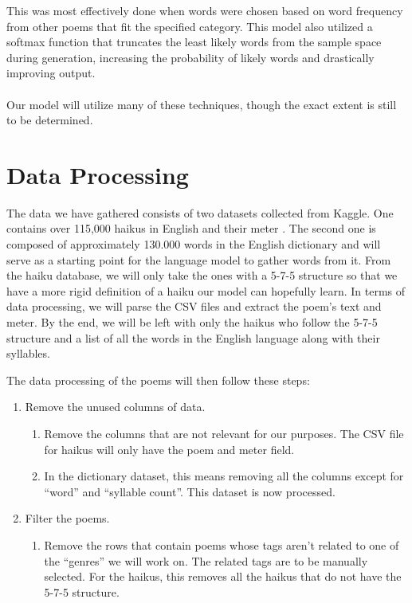 \documentclass{article} %
\begin{document}
This was most effectively done when words were chosen based on word frequency from other poems that fit the specified category. 
This model also utilized a softmax function that truncates the least likely words from the sample space during generation, increasing the probability of likely words and drastically improving output.\\\\
Our model will utilize many of these techniques, though the exact extent is still to be determined.


\section{Data Processing}

The data we have gathered consists of two datasets collected from Kaggle. One contains over 115,000 haikus in English and their meter \citep{Jhalani_2020}. The second one is composed of approximately 130.000 words in the English dictionary \citep{Schwartz_2022} and will serve as a starting point for the language model to gather words from it. From the haiku database, we will only take the ones with a 5-7-5 structure so that we have a more rigid definition of a haiku our model can hopefully learn.  In terms of data processing, we will parse the CSV files and extract the poem’s text and meter. By the end, we will be left with only the haikus who follow the 5-7-5 structure and a list of all the words in the English language along with their syllables.

The data processing of the poems will then follow these steps:

\begin{enumerate}
    \item Remove the unused columns of data.
    \begin{enumerate}[label=\alph*)] %
        \item Remove the columns that are not relevant for our purposes. The CSV file for haikus will only have the poem and meter field.
        \item In the dictionary dataset, this means removing all the columns except for “word” and “syllable count”. This dataset is now processed.
    \end{enumerate}
    \item Filter the poems.
    \begin{enumerate}[label=\alph*)]
        \item Remove the rows that contain poems whose tags aren’t related to one of the “genres” we will work on. The related tags are to be manually selected. For the haikus, this removes all the haikus that do not have the 5-7-5 structure.
    \end{enumerate}
\end{enumerate}
\end{document}
